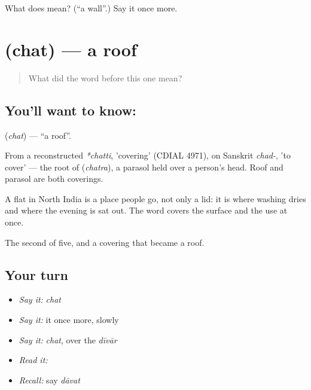 \begin{tcolorbox}[breakable,colback=teal!4,colframe=teal!35!black,title={Before you move on}]
What does  mean? (\textquotedblleft{}a wall\textquotedblright{}.) Say it once more.
\end{tcolorbox}
\section[\texorpdfstring{\hi{छत} (chat)}{छत (chat)}]{ (chat) — a roof}

\label{lesson:HI-C58-roof}



\begin{quote}
What did the word before this one mean?
\end{quote}

\subsection*{You'll want to know: }
\textbf{} (\emph{chat}) — \textquotedblleft{}a roof\textquotedblright{}.

From a reconstructed \emph{*chatti}, 'covering' (CDIAL 4971), on Sanskrit \emph{chad-}, 'to cover' — the root of  (\emph{chatra}), a parasol held over a person's head. Roof and parasol are both coverings.

A flat  in North India is a place people go, not only a lid: it is where washing dries and where the evening is sat out. The word covers the surface and the use at once.

\begin{grammarlens}[title={What you've built}]
The second of five, and a covering that became a roof.
\end{grammarlens}

\subsection*{Your turn}
\begin{itemize}
\raggedright
  \item \emph{Say it:} \emph{chat}
  \item \emph{Say it:} it once more, slowly
  \item \emph{Say it:} \emph{chat}, over the \emph{dīvār}
  \item \emph{Read it:} \textbf{}
  \item \emph{Recall:} say \emph{dāvat}
\end{itemize}

